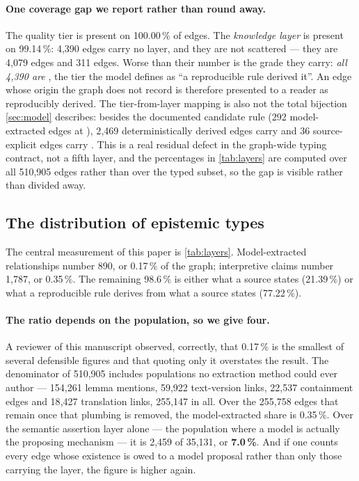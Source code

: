 \paragraph{One coverage gap we report rather than round away.} The quality tier is
present on 100.00\,\% of edges. The \emph{knowledge layer} is present on 99.14\,\%:
4{,}390 edges carry no layer, and they are not scattered --- they are 4{,}079
 edges and 311  edges. Worse than
their number is the grade they carry: \emph{all 4{,}390 are }, the tier
the model defines as ``a reproducible rule derived it''. An edge whose origin the
graph does not record is therefore presented to a reader as reproducibly derived.
The tier-from-layer mapping is also not the total bijection \cref{sec:model}
describes: besides the documented candidate rule (292 model-extracted edges at
), 2{,}469 deterministically derived edges carry  and 36
source-explicit edges carry . This is a real residual defect in the
graph-wide typing contract, not a fifth layer, and the
percentages in \cref{tab:layers} are computed over all 510{,}905 edges rather than
over the typed subset, so the gap is visible rather than divided away.

\subsection{The distribution of epistemic types}
\label{sec:eval-distribution}

The central measurement of this paper is \cref{tab:layers}. Model-extracted
relationships number 890, or 0.17\,\% of the graph; interpretive claims number
1{,}787, or 0.35\,\%. The remaining 98.6\,\% is either what a source states
(21.39\,\%) or what a reproducible rule derives from what a source states
(77.22\,\%).

\paragraph{The ratio depends on the population, so we give four.} A reviewer of
this manuscript observed, correctly, that 0.17\,\% is the smallest of several
defensible figures and that quoting only it overstates the result. The denominator
of 510{,}905 includes populations no extraction method could ever author ---
154{,}261 lemma mentions, 59{,}922 text-version links, 22{,}537 containment edges
and 18{,}427 translation links, 255{,}147 in all. Over the 255{,}758 edges that
remain once that plumbing is removed, the model-extracted share is 0.35\,\%. Over
the semantic
assertion layer alone --- the population where a model is actually the proposing
mechanism --- it is 2{,}459 of 35{,}131, or \textbf{7.0\,\%}. And if one counts
every edge whose existence is owed to a model proposal rather than only those
carrying the layer, the figure is higher again.

